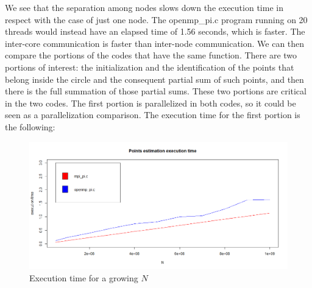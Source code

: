 \documentclass{article}
\begin{document}
We see that the separation among nodes slows down the execution time in respect with the case of just one node. The openmp\_pi.c program running on 20 threads would instead have an elapsed time of 1.56 seconds, which is faster. The inter-core communication is faster than inter-node communication.
We can then compare the portions of the codes that have the same function.
There are two portions of interest: the initialization and the identification of the points that belong inside the circle and the consequent partial sum of such points, and then there is the full summation of those partial sums. These two portions are critical in the two codes.
The first portion is parallelized in both codes, so it could be seen as a parallelization comparison.
The execution time for the first portion is the following:

\begin{figure}[H] %
	\centering
	\includegraphics[width=0.9\columnwidth]{graphs/pi_points_estimation_execution_time.png} %
	\caption{Execution time for a growing $N$}
\end{figure}
\end{document}
